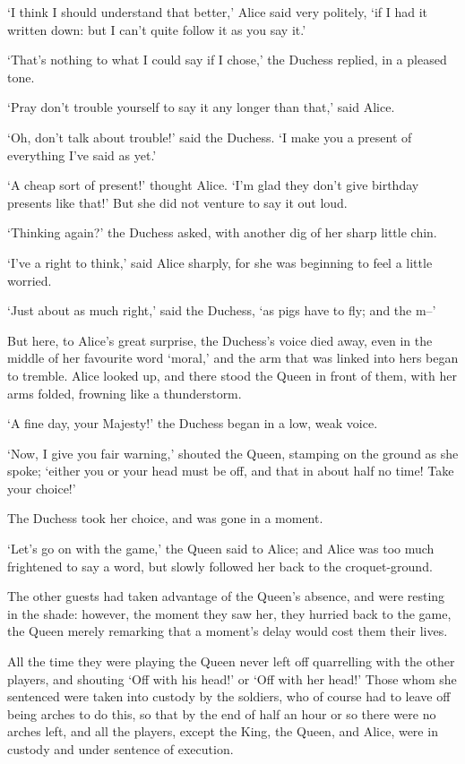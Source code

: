 \documentclass[statementpaper,twoside,openany]{memoir}
\begin{document}
`I think I should understand that better,' Alice said very politely, `if I had it written down: but I can't quite follow it as you say it.'

`That's nothing to what I could say if I chose,' the Duchess replied, in a pleased tone.

`Pray don't trouble yourself to say it any longer than that,' said Alice.

`Oh, don't talk about trouble!' said the Duchess. `I make you a present of everything I've said as yet.'

`A cheap sort of present!' thought Alice. `I'm glad they don't give birthday presents like that!' But she did not venture to say it out loud.

`Thinking again?' the Duchess asked, with another dig of her sharp little chin.

`I've a right to think,' said Alice sharply, for she was beginning to feel a little worried.

`Just about as much right,' said the Duchess, `as pigs have to fly; and the m--'

But here, to Alice's great surprise, the Duchess's voice died away, even in the middle of her favourite word `moral,' and the arm that was linked into hers began to tremble. Alice looked up, and there stood the Queen in front of them, with her arms folded, frowning like a thunderstorm.

`A fine day, your Majesty!' the Duchess began in a low, weak voice.

`Now, I give you fair warning,' shouted the Queen, stamping on the ground as she spoke; `either you or your head must be off, and that in about half no time! Take your choice!'

The Duchess took her choice, and was gone in a moment.

`Let's go on with the game,' the Queen said to Alice; and Alice was too much frightened to say a word, but slowly followed her back to the croquet-ground.

The other guests had taken advantage of the Queen's absence, and were resting in the shade: however, the moment they saw her, they hurried back to the game, the Queen merely remarking that a moment's delay would cost them their lives.

All the time they were playing the Queen never left off quarrelling with the other players, and shouting `Off with his head!' or `Off with her head!' Those whom she sentenced were taken into custody by the soldiers, who of course had to leave off being arches to do this, so that by the end of half an hour or so there were no arches left, and all the players, except the King, the Queen, and Alice, were in custody and under sentence of execution.
\end{document}
